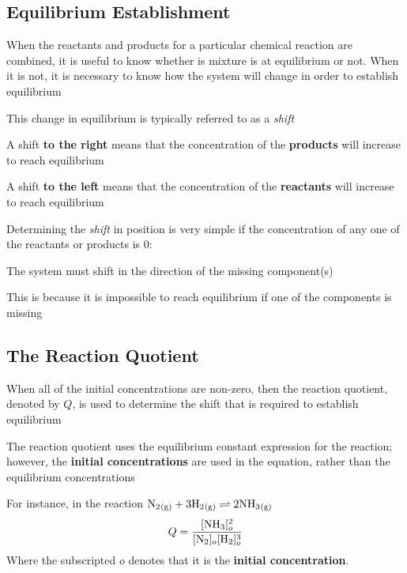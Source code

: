 \subsection{Equilibrium Establishment}
\begin{bulleted-list}
    \item When the reactants and products for a particular chemical reaction are combined, it
        is useful to know whether is mixture is at equilibrium or not. When it is not, it is
        necessary to know how the system will change in order to establish equilibrium
    \item This change in equilibrium is typically referred to as a \textit{shift}
    \item A shift \textbf{to the right} means that the concentration of the \textbf{products} will
        increase to reach equilibrium
    \item A shift \textbf{to the left} means that the concentration of the \textbf{reactants} will
        increase to reach equilibrium
\end{bulleted-list}

Determining the \textit{shift} in position is very simple if the concentration of any one of the
reactants or products is 0:
\begin{bulleted-list}
    \item The system must shift in the direction of the missing component(s)
    \item This is because it is impossible to reach equilibrium if one of the components is missing
\end{bulleted-list}

\subsection{The Reaction Quotient}
\begin{bulleted-list}
    \item When all of the initial concentrations are non-zero, then the reaction quotient, denoted
        by $Q$, is used to determine the shift that is required to establish equilibrium
    \item The reaction quotient uses the equilibrium constant expression for the reaction;
        however, the \textbf{initial concentrations} are used in the equation, rather than the
        equilibrium concentrations
\end{bulleted-list}
For instance, in the reaction $\ch{N2_{(g)}}+3 \ch{H2_{(g)}}\rightleftharpoons2 \ch{NH3_{(g)}}$ 
\[
    Q=\frac{[\ch{NH3}]^2_o}{[\ch{N2}]_o[\ch{H2}]^3_o}
\]
Where the subscripted $o$ denotes that it is the \textbf{initial concentration}.\\

